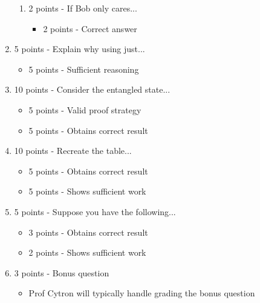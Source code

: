 \documentclass[12pt]{article}
\begin{document}
\begin{enumerate}[font=\bfseries]
\begin{enumerate}
            \item 2 points - If Bob only cares...
            \begin{itemize}
                \item 2 points - Correct answer
            \end{itemize}
        \end{enumerate}
    \item 5 points - Explain why using just...
        \begin{itemize}
            \item 5 points - Sufficient reasoning
        \end{itemize}
    \item 10 points - Consider the entangled state...
        \begin{itemize}
            \item 5 points - Valid proof strategy
            \item 5 points - Obtains correct result
        \end{itemize}
    \item 10 points - Recreate the table...
        \begin{itemize}
            \item 5 points - Obtains correct result
            \item 5 points - Shows sufficient work
        \end{itemize}
    \item 5 points - Suppose you have the following...
        \begin{itemize}
            \item 3 points - Obtains correct result
            \item 2 points - Shows sufficient work
        \end{itemize}
    \item 3 points - Bonus question
        \begin{itemize}
            \item Prof Cytron will typically handle grading the bonus question
        \end{itemize}
\end{enumerate}
\end{document}
